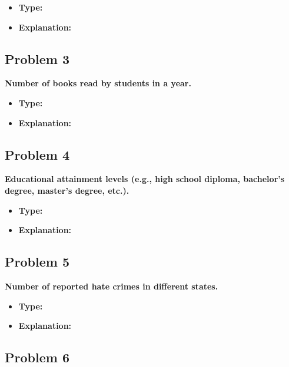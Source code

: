 \documentclass[
  letterpaper,
  DIV=11,
  numbers=noendperiod]{scrreprt}
\begin{document}
\begin{itemize}
\item
  \textbf{Type:}
\item
  \textbf{Explanation:}
\end{itemize}

\subsection*{Problem 3}\label{problem-3}

\textbf{Number of books read by students in a year.}

\begin{itemize}
\item
  \textbf{Type:}
\item
  \textbf{Explanation:}
\end{itemize}

\subsection*{Problem 4}\label{problem-4}

\textbf{Educational attainment levels (e.g., high school diploma,
bachelor's degree, master's degree, etc.).}

\begin{itemize}
\item
  \textbf{Type:}
\item
  \textbf{Explanation:}
\end{itemize}

\subsection*{Problem 5}\label{problem-5}

\textbf{Number of reported hate crimes in different states.}

\begin{itemize}
\item
  \textbf{Type:}
\item
  \textbf{Explanation:}
\end{itemize}

\subsection*{Problem 6}\label{problem-6}
\end{document}
